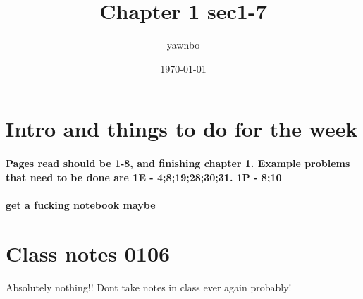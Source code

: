 \documentclass[a4paper]{article}
\title{Chapter 1 sec1-7}
\author{yawnbo}
\date{\today}
\begin{document}
\section{Intro and things to do for the week}%
\label{sec:Intro and things to do for the week}
\paragraph{Pages read should be 1-8, and finishing chapter 1. Example problems that need to be done are 1E - 4;8;19;28;30;31. 1P - 8;10}
\paragraph{get a fucking notebook maybe}
\section{Class notes 0106}%
\label{sec:Class notes 0106}
Absolutely nothing!!
Dont take notes in class ever again probably!
\end{document}
